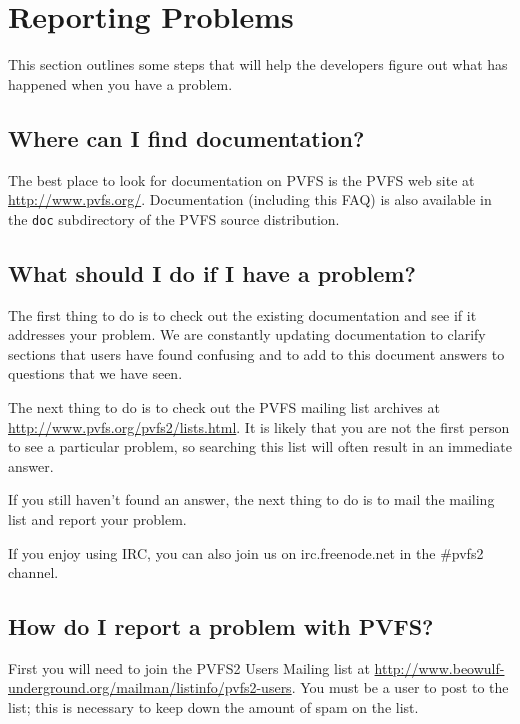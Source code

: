 \documentclass[11pt,letterpaper]{article}
\begin{document}
%
%
\section{Reporting Problems}

This section outlines some steps that will help the developers figure out what
has happened when you have a problem.

\subsection{Where can I find documentation?}

The best place to look for documentation on PVFS is the PVFS web site at
\url{http://www.pvfs.org/}.  Documentation (including this FAQ) is also
available in the \texttt{doc} subdirectory of the PVFS source distribution.

\subsection{What should I do if I have a problem?}

The first thing to do is to check out the existing documentation and see if it
addresses your problem.  We are constantly updating documentation to clarify
sections that users have found confusing and to add to this document answers
to questions that we have seen.

The next thing to do is to check out the PVFS mailing list archives at
\url{http://www.pvfs.org/pvfs2/lists.html}.  It is likely that you are not
the first person to see a particular problem, so searching this list will
often result in an immediate answer.

If you still haven't found an answer, the next thing to do is to mail the
mailing list and report your problem.

If you enjoy using IRC, you can also join us on irc.freenode.net in
the \#pvfs2 channel.

\subsection{How do I report a problem with PVFS?}

First you will need to join the PVFS2 Users Mailing list at
\url{http://www.beowulf-underground.org/mailman/listinfo/pvfs2-users}.  You
must be a user to post to the list; this is necessary to keep down the amount
of spam on the list.
\end{document}
